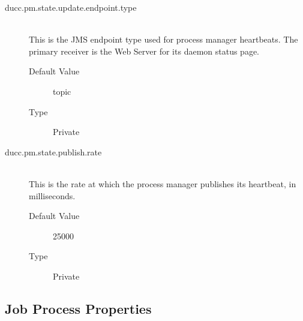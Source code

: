 \begin{description}
      \item[ducc.pm.state.update.endpoint.type] \hfill \\
        This is the JMS endpoint type used for process manager heartbeats. The primary receiver 
        is the Web Server for its daemon status page. 
        \begin{description}
          \item[Default Value] topic 
          \item[Type] Private 
        \end{description}
        
      \item[ducc.pm.state.publish.rate] \hfill \\
        This is the rate at which the process manager publishes its heartbeat, in milliseconds. 
        \begin{description}
        \item[Default Value] 25000 
        \item[Type] Private 
        \end{description}
        

      \end{description}
      

\subsection{Job Process Properties}

